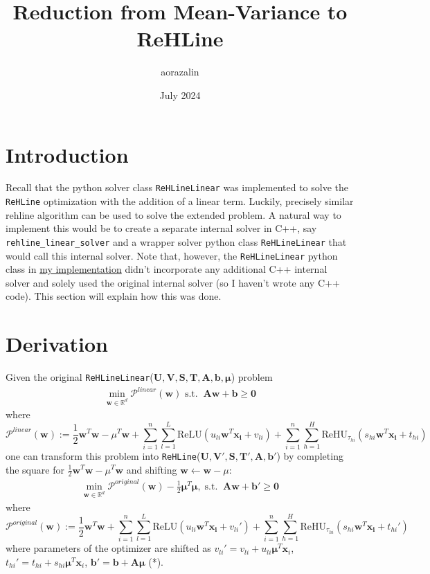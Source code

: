 \documentclass[12pt, a4paper]{article}
\title{Reduction from Mean-Variance to ReHLine}
\author{aorazalin }
\date{July 2024}
\newcommand{\R}{\mathbb{R}}
\newcommand*{\V}[1]{\mathbf{#1}}
\begin{document}
\maketitle


\section{Introduction}
Recall that the python solver class \texttt{ReHLineLinear} was implemented to solve the \texttt{ReHLine} optimization with the addition of a linear term. Luckily, precisely similar rehline algorithm can be used to solve the extended problem. A natural way to implement this would be to create a separate internal solver in C++, say \texttt{rehline\_linear\_solver} and a wrapper solver python class \texttt{ReHLineLinear} that would call this internal solver.
Note that, however, the \texttt{ReHLineLinear} python class in \href{https://github.com/softmin/ReHLine-python/pull/4/commits/971579d231caeace0936b91d5f38fea1b82b72d8#diff-f3001c26be861b89a47a48e70adc111b7e82e512134d4cb607a260ceaa006453}{my implementation} didn't incorporate any additional C++ internal solver and solely used the original internal solver (so I haven't wrote any C++ code). This section will explain how this was done.

\section{Derivation}


Given the original \texttt{ReHLineLinear}($\V{U}, \V{V}, \V{S}, \V{T}, \V{A}, \V{b}, \V{\mu}$) problem
\begin{align*}
    \min_{\V{w} \in \R^d} \mathcal{P}^{linear}(\V{w}) \text{  s.t.} \;\; \V{Aw} + \V{b} \geq \V{0}
\end{align*}
where
$$\mathcal{P}^{linear}(\V{w}) := \frac{1}{2} \V{w}^T \V{w} - \mu^T \V{w} + \sum_{i=1}^n \sum_{l=1}^L \text{ReLU}(u_{li} \V{w}^T \V{x_i} + v_{li}) + \sum_{i=1}^n \sum_{h=1}^H \text{ReHU}_{\tau_{hi}} (s_{hi} \V{w}^T \V{x_i} + t_{hi}) $$
one can transform this problem into \texttt{ReHLine}($\V{U}, \V{V}', \V{S}, \V{T}', \V{A}, \V{b}'$) by completing the square for $\frac{1}{2} \V{w}^T \V{w} - \mu^T \V{w}$ and shifting $\V{w} \leftarrow \V{w} - \mu$:
\begin{align*}
    \min_{\V{w} \in \R^d} \mathcal{P}^{original}(\V{w}) - \frac{1}{2} \V{\mu}^T \V{\mu}, \;\text{s.t.} \;\; \V{Aw} + \V{b}' \geq \V{0}
\end{align*}
where 
$$\mathcal{P}^{original}(\V{w}) := \frac{1}{2} \V{w}^T \V{w} + \sum_{i=1}^n \sum_{l=1}^L \text{ReLU}(u_{li} \V{w}^T \V{x_i} + v_{li}') + \sum_{i=1}^n \sum_{h=1}^H \text{ReHU}_{\tau_{hi}} (s_{hi} \V{w}^T \V{x_i} + t_{hi}') $$
where parameters of the optimizer are shifted as $v_{li}' = v_{li} + u_{li} \V{\mu}^T \V{x}_i$, $t_{hi}' = t_{hi} + s_{hi} \V{\mu}^T \V{x}_i$, $\V{b}' = \V{b} + \V{A \mu}$ (*).
\end{document}

